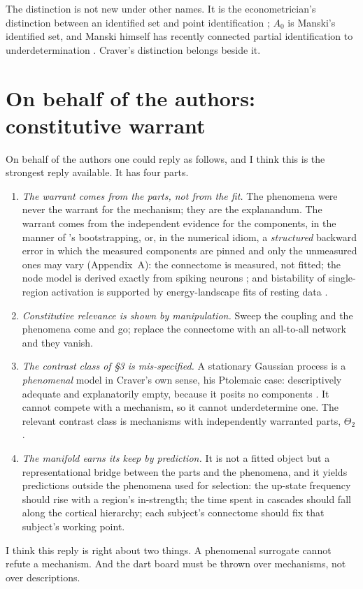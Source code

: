 \documentclass[11pt]{article}
\begin{document}
The distinction is not new under other names. It is the econometrician's distinction between an identified set and point identification \parencite{koopmans1950,manski2003}; $A_0$ is Manski's identified set, and Manski himself has recently connected partial identification to underdetermination \parencite{manski2026}. Craver's distinction belongs beside it.

\section{On behalf of the authors: constitutive warrant}
On behalf of the authors one could reply as follows, and I think this is the strongest reply available. It has four parts.
\begin{enumerate}
\item[R1] \emph{The warrant comes from the parts, not from the fit.} The phenomena were never the warrant for the mechanism; they are the explanandum. The warrant comes from the independent evidence for the components, in the manner of \textcite{glymour1980}'s bootstrapping, or, in the numerical idiom, a \emph{structured} backward error in which the measured components are pinned and only the unmeasured ones may vary (Appendix~A): the connectome is measured, not fitted; the node model is derived exactly from spiking neurons \parencite{montbrio2015}; and bistability of single-region activation is supported by energy-landscape fits of resting data \parencite[refs 39--41 therein, Watanabe et al.\ 2013, 2014 and Gu et al.\ 2018]{fousek2024}.
\item[R2] \emph{Constitutive relevance is shown by manipulation.} Sweep the coupling and the phenomena come and go; replace the connectome with an all-to-all network and they vanish.
\item[R3] \emph{The contrast class of \S3 is mis-specified.} A stationary Gaussian process is a \emph{phenomenal} model in Craver's own sense, his Ptolemaic case: descriptively adequate and explanatorily empty, because it posits no components \parencite{craver2006}. It cannot compete with a mechanism, so it cannot underdetermine one. The relevant contrast class is mechanisms with independently warranted parts, $\Theta_2$.
\item[R4] \emph{The manifold earns its keep by prediction.} It is not a fitted object but a representational bridge between the parts and the phenomena, and it yields predictions outside the phenomena used for selection: the up-state frequency should rise with a region's in-strength; the time spent in cascades should fall along the cortical hierarchy; each subject's connectome should fix that subject's working point.
\end{enumerate}
I think this reply is right about two things. A phenomenal surrogate cannot refute a mechanism. And the dart board must be thrown over mechanisms, not over descriptions.
\end{document}
